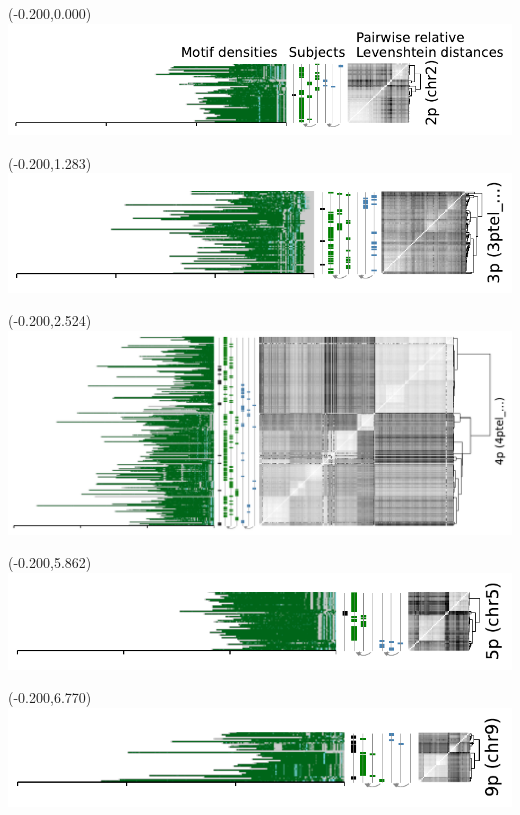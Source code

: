 \documentclass{article}
\begin{document}
\begin{textblock}{13}(-0.200,0.000)\includegraphics{Figure_4/chr2.pdf}\end{textblock}
\begin{textblock}{13}(-0.200,1.283)\includegraphics{Figure_4/3ptel_1-500K_1_12_12.pdf}\end{textblock}
\begin{textblock}{13}(-0.200,2.524)\includegraphics{Figure_4/4ptel_1-500K_1_12_12.pdf}\end{textblock}
\begin{textblock}{13}(-0.200,5.862)\includegraphics{Figure_4/chr5.pdf}\end{textblock}
\begin{textblock}{13}(-0.200,6.770)\includegraphics{Figure_4/chr9.pdf}\end{textblock}
\end{document}
